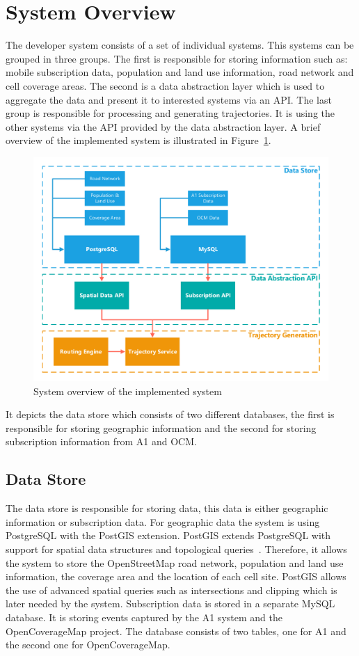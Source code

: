 \documentclass[master,english]{hgbthesis}
\begin{document}
\section{System Overview}
The developer system consists of a set of individual systems. This systems can be grouped in three groups. The first is responsible for storing information such as: mobile subscription data, population and land use information, road network and cell coverage areas. The second is a data abstraction layer which is used to aggregate the data and present it to interested systems via an API. The last group is responsible for processing and generating trajectories. It is using the other systems via the API provided by the data abstraction layer. A brief overview of the implemented system is illustrated in Figure~\ref{fig:systemoverview}.
\begin{figure}
\centering
\includegraphics[width=\linewidth]{./images/systemoverview}
\caption{System overview of the implemented system}
\label{fig:systemoverview}
\end{figure}
It depicts the data store which consists of two different databases, the first is responsible for storing geographic information and the second for storing subscription information from A1 and OCM.
\subsection{Data Store}
The data store is responsible for storing data, this data is either geographic information or subscription data. For geographic data the system is using PostgreSQL with the PostGIS extension. PostGIS extends PostgreSQL with support for spatial data structures and topological queries~\cite{Obe2011}. Therefore, it allows the system to store the OpenStreetMap road network, population and land use information, the coverage area and the location of each cell site. PostGIS allows the use of advanced spatial queries such as intersections and clipping which is later needed by the system.
Subscription data is stored in a separate MySQL database. It is storing events captured by the A1 system and the OpenCoverageMap project. The database consists of two tables, one for A1 and the second one for OpenCoverageMap.
\end{document}
